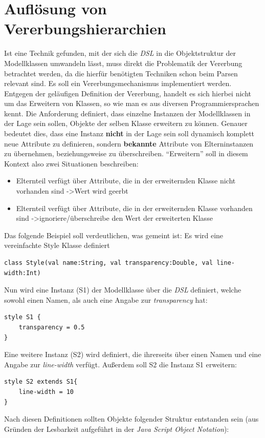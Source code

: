 \section{Auflösung von Vererbungshierarchien}
Ist eine Technik gefunden, mit der sich die \textit{DSL} in die Objektstruktur der Modellklassen umwandeln lässt, muss direkt die Problematik der Vererbung betrachtet werden, da die hierfür benötigten Techniken schon beim Parsen relevant sind. Es soll ein Vererbungsmechanismus implementiert werden. Entgegen der geläufigen Definition der Vererbung, handelt es sich hierbei nicht um das Erweitern von Klassen, so wie man es aus diversen Programmiersprachen kennt. Die Anforderung definiert, dass einzelne Instanzen der Modellklassen in der Lage sein sollen, Objekte der selben Klasse erweitern zu können. Genauer bedeutet dies, dass eine Instanz \textbf{nicht} in der Lage sein soll dynamisch komplett neue Attribute zu definieren, sondern \textbf{bekannte} Attribute von Elterninstanzen zu übernehmen, beziehungsweise zu überschreiben. "`Erweitern"' soll in diesem Kontext also zwei Situationen beschreiben:
\begin{itemize}
\item Elternteil verfügt über Attribute, die in der erweiternden Klasse nicht vorhanden sind -\textgreater Wert wird geerbt
\item Elternteil verfügt über Attribute, die in der erweiternden Klasse vorhanden sind -\textgreater ignoriere/überschreibe den Wert der erweiterten Klasse
\end{itemize}
Das folgende Beispiel soll verdeutlichen, was gemeint ist:
Es wird eine vereinfachte Style Klasse definiert
\begin{lstlisting}[style=scala]
class Style(val name:String, val transparency:Double, val line-width:Int)
\end{lstlisting}Nun wird eine Instanz (S1) der Modellklasse über die \textit{DSL} definiert, welche sowohl einen Namen, als auch eine Angabe zur \textit{transparency} hat:
\begin{lstlisting}[style=spray]
style S1 {
    transparency = 0.5
}
\end{lstlisting}Eine weitere Instanz (S2) wird definiert, die ihrerseits über einen Namen und eine Angabe zur \textit{line-width} verfügt. Außerdem soll S2 die Instanz S1 erweitern:
\begin{lstlisting}[style=spray]
style S2 extends S1{
    line-width = 10
}
\end{lstlisting}
Nach diesen Definitionen sollten Objekte folgender Struktur entstanden sein (aus Gründen der Lesbarkeit aufgeführt in der \textit{Java Script Object Notation}):
